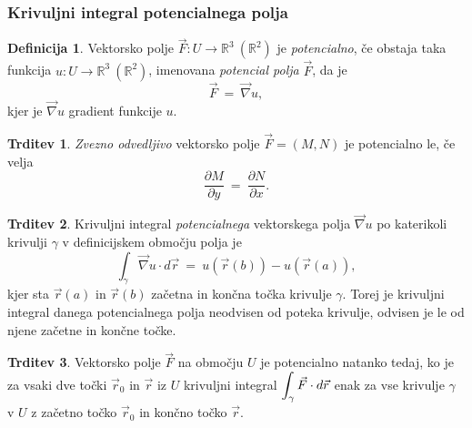 \documentclass[11pt]{article}
\theoremstyle{definition}
\newtheorem{definicija}{Definicija}[section]
\theoremstyle{definition}
\newtheorem{trditev}{Trditev}[section]
\theoremstyle{definition}
\begin{document}
\subsubsection{Krivuljni integral potencialnega polja}

\begin{definicija}

Vektorsko polje $\vec{F}: U \rightarrow \mathbb{R}^3 ~(\mathbb{R}^2)$ je \textit{potencialno}, če obstaja taka funkcija $u: U \rightarrow \mathbb{R}^3 ~(\mathbb{R}^2)$, imenovana \textit{potencial polja} $\vec{F}$, da je
$$ \vec{F} ~=~ \vec{\nabla} u,$$
kjer je $\vec{\nabla} u$ gradient funkcije $u$.

\end{definicija}
\vspace{0.5cm}

\begin{trditev}

\textit{Zvezno odvedljivo} vektorsko polje $\vec{F} = (M, N)$ je potencialno le, če velja
$$\frac{\partial M}{\partial y} ~=~ \frac{\partial N}{\partial x}.$$

\end{trditev}
\vspace{0.5cm}

\begin{trditev}

Krivuljni integral \textit{potencialnega} vektorskega polja $\vec{\nabla} u$ po katerikoli krivulji $\gamma$ v definicijskem območju polja je
$$\int_{\gamma} \vec{\nabla} u \cdot d\vec{r} ~=~ u(\vec{r}(b)) - u(\vec{r}(a)),$$
kjer sta $\vec{r}(a)$ in $\vec{r}(b)$ začetna in končna točka krivulje $\gamma$. Torej je krivuljni integral danega potencialnega polja neodvisen od poteka krivulje, odvisen je le od njene začetne in končne točke.

\end{trditev}
\vspace{0.5cm}

\begin{trditev}

Vektorsko polje $\vec{F}$ na območju $U$ je potencialno natanko tedaj, ko je za vsaki dve točki $\vec{r}_0$ in $\vec{r}$ iz $U$ krivuljni integral $\mathlarger{\int_{\gamma} \vec{F} \cdot d\vec{r}}$ enak za vse krivulje $\gamma$ v $U$ z začetno točko $\vec{r}_0$ in končno točko $\vec{r}$.

\end{trditev}
\vspace{0.5cm}
\end{document}
